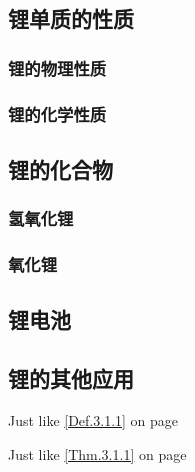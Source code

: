 \documentclass[color=orange,openany]{textbook-cn}
\begin{document}
\begin{Paracol}
\subsection{锂单质的性质}
\lipsum[2][1-8]
\subsubsection{锂的物理性质}
\lipsum[1-2]
\subsubsection{锂的化学性质}
\lipsum[1-2]
\subsection{锂的化合物}
\lipsum[2][1-8]
\subsubsection{氢氧化锂}
\lipsum[1-2]
\subsubsection{氧化锂}
\lipsum[1-3]

\begin{Block}[文字标题]
\lipsum[2]
\end{Block}


\begin{Block}
\lipsum[2]
\end{Block}

\subsection{锂电池}
\lipsum[1-2]
\subsection{锂的其他应用}
\lipsum[1-2]
\begin{Definition}[定义名称]
\lipsum[1][1-3]
\end{Definition}

Just like \ref{Def.3.1.1} on page \pageref{Def.3.1.1}


\begin{Theorem*}[定理名称]
\lipsum[1][1-3]
\end{Theorem*}

Just like \ref{Thm.3.1.1} on page \pageref{Thm.3.1.1}

\end{Paracol}
\end{document}
